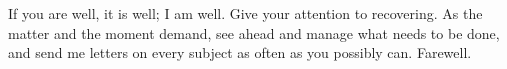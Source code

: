 

If you are well, it is well; I am well. Give your attention to recovering. As the matter and the moment demand, see ahead and manage what needs to be done, and send me letters on every subject as often as you possibly can. Farewell.
